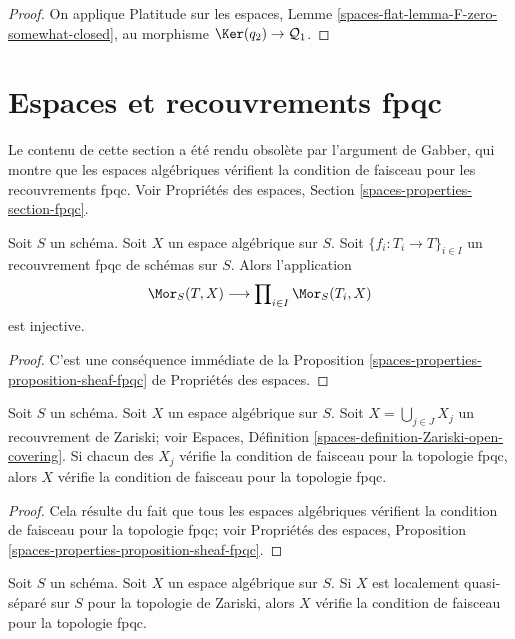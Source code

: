 \begin{proof}
On applique Platitude sur les espaces, Lemme \ref{spaces-flat-lemma-F-zero-somewhat-closed},
au morphisme $\Ker(q_2) \to \mathcal{Q}_1$.
\end{proof}







\section{Espaces et recouvrements fpqc}
\label{section-fpqc}

\noindent
Le contenu de cette section a \'et\'e rendu obsol\`ete par l'argument de Gabber, qui montre que
les espaces alg\'ebriques v\'erifient la condition de faisceau pour les
recouvrements fpqc. Voir
Propri\'et\'es des espaces, Section \ref{spaces-properties-section-fpqc}.

\begin{lemma}
\label{lemma-separated-fpqc}
Soit $S$ un sch\'ema. Soit $X$ un espace alg\'ebrique sur $S$.
Soit $\{f_i : T_i \to T\}_{i \in I}$ un recouvrement fpqc de sch\'emas sur $S$.
Alors l'application
$$
\Mor_S(T, X)
\longrightarrow
\prod\nolimits_{i \in I} \Mor_S(T_i, X)
$$
est injective.
\end{lemma}

\begin{proof}
C'est une cons\'equence imm\'ediate de la Proposition
\ref{spaces-properties-proposition-sheaf-fpqc}
de Propri\'et\'es des espaces.
\end{proof}

\begin{lemma}
\label{lemma-sheaf-fpqc-open-covering}
Soit $S$ un sch\'ema. Soit $X$ un espace alg\'ebrique sur $S$.
Soit $X = \bigcup_{j \in J} X_j$ un recouvrement de Zariski; voir
Espaces, D\'efinition \ref{spaces-definition-Zariski-open-covering}.
Si chacun des $X_j$ v\'erifie la condition de faisceau pour la topologie fpqc,
alors $X$ v\'erifie la condition de faisceau pour la topologie fpqc.
\end{lemma}

\begin{proof}
Cela r\'esulte du fait que tous les espaces alg\'ebriques v\'erifient la condition
de faisceau pour la topologie fpqc; voir
Propri\'et\'es des espaces, Proposition
\ref{spaces-properties-proposition-sheaf-fpqc}.
\end{proof}

\begin{lemma}
\label{lemma-sheaf-fpqc-quasi-separated}
Soit $S$ un sch\'ema. Soit $X$ un espace alg\'ebrique sur $S$.
Si $X$ est localement quasi-s\'epar\'e sur $S$ pour la topologie de Zariski,
alors $X$ v\'erifie la condition de faisceau pour la topologie fpqc.
\end{lemma}

